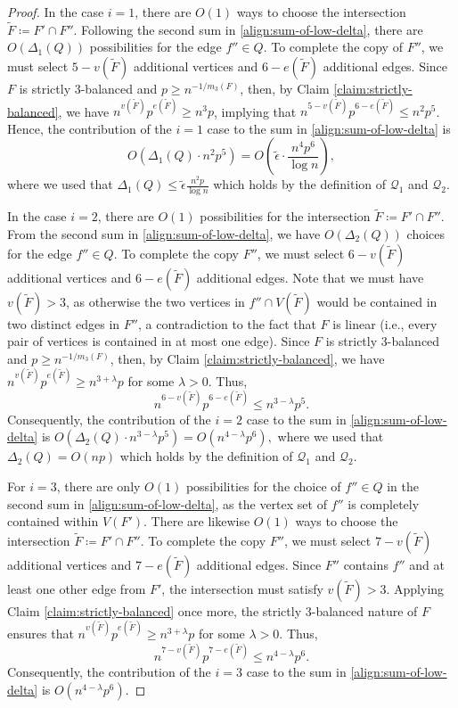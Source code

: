 \documentclass[11pt,a4paper,oneside,reqno]{amsart}
\newcommand{\cQ}{\mathcal{Q}}
\newcommand{\1}{\mathbbm{1}} %
\renewcommand{\le}{\leqslant}
\renewcommand{\ge}{\geqslant}
\begin{document}
\begin{proof}
    In the case $i = 1$, there are $O(1)$ ways to choose the intersection $\tilde{F} \coloneqq F' \cap F''$. Following the second sum in \eqref{align:sum-of-low-delta}, there are $O(\Delta_1(Q))$ possibilities for the edge $f'' \in Q$. To complete the copy of $F''$, we must select $5 - v(\tilde{F})$ additional vertices and $6 - e(\tilde{F})$ additional edges. Since $F$ is strictly $3$-balanced and $p \ge n^{-1/m_3(F)}$, then, by Claim \ref{claim:strictly-balanced}, we have $n^{v(\tilde{F})} p^{e(\tilde{F})} \ge n^3 p$, implying that $n^{5 - v(\tilde{F})} p^{6 - e(\tilde{F})} \le n^{2} p^{5}$. 
    Hence, the contribution of the $i=1$ case to the sum in \eqref{align:sum-of-low-delta} is
    \[
        O\left(\Delta_1(Q) \cdot n^{2} p^{5}\right) = O\left(\tilde{\epsilon} \cdot \frac{n^{4} p^{6}}{\log n}\right),
    \]
where we used that $\Delta_1(Q) \le \tilde{\epsilon} \frac{n^2 p}{\log n}$ which holds by the definition of $\cQ_1$ and $\cQ_2$.

    In the case $i=2$, there are $O(1)$ possibilities for the intersection $\tilde{F} \coloneqq F' \cap F''$. From the second sum in \eqref{align:sum-of-low-delta}, we have $O(\Delta_2(Q))$ choices for the edge $f'' \in Q$. To complete the copy $F''$, we must select $6 - v(\tilde{F})$ additional vertices and $6 - e(\tilde{F})$ additional edges. Note that we must have $v(\tilde{F}) > 3$, as otherwise the two vertices in $f'' \cap V(\tilde{F})$ would be contained in two distinct edges in $F''$, a contradiction to the fact that $F$ is linear (i.e., every pair of vertices is contained in at most one edge). Since $F$ is strictly $3$-balanced and $p \ge n^{-1/m_3(F)}$, then, by Claim \ref{claim:strictly-balanced}, we have $n^{v(\tilde{F})} p^{e(\tilde{F})} \ge n^{3 + \lambda} p$ for some $\lambda > 0$. Thus, 
    \[
        n^{6 - v(\tilde{F})} p^{6 - e(\tilde{F})} \le n^{3 - \lambda} p^{5}.
    \]
    Consequently, the contribution of the $i=2$ case to the sum in \eqref{align:sum-of-low-delta} is
    $O\left(\Delta_2(Q) \cdot n^{3 - \lambda} p^{5}\right) = O\left(n^{4 - \lambda} p^{6}\right),$
where we used that $\Delta_2(Q) = O(np)$ which holds by the definition of $\cQ_1$ and $\cQ_2$.

    For $i=3$, there are only $O(1)$ possibilities for the choice of $f'' \in Q$ in the second sum in \eqref{align:sum-of-low-delta}, as the vertex set of $f''$ is completely contained within $V(F')$. There are likewise $O(1)$ ways to choose the intersection $\tilde{F} \coloneqq F' \cap F''$. To complete the copy $F''$, we must select $7 - v(\tilde{F})$ additional vertices and $7 - e(\tilde{F})$ additional edges. Since $F''$ contains $f''$ and at least one other edge from $F'$, the intersection must satisfy $v(\tilde{F}) > 3$. Applying Claim \ref{claim:strictly-balanced} once more, the strictly $3$-balanced nature of $F$ ensures that $n^{v(\tilde{F})} p^{e(\tilde{F})} \ge n^{3 + \lambda} p$ for some $\lambda > 0$. Thus, 
    \[
        n^{7 - v(\tilde{F})} p^{7 - e(\tilde{F})} \le n^{4 - \lambda} p^{6}.
    \]
    Consequently, the contribution of the $i=3$ case to the sum in \eqref{align:sum-of-low-delta} is $O\left(n^{4 - \lambda} p^{6}\right)$.


\end{proof}
\end{document}
